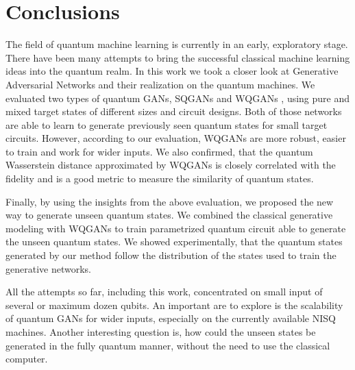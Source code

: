 \chapter{Conclusions}\label{chapter:conclusions}
The field of quantum machine learning is currently in an early, exploratory
stage. There have been many attempts to bring the successful classical machine
learning ideas into the quantum realm. In this work we took a closer look at
Generative Adversarial Networks and their realization on the quantum machines.
We evaluated two types of quantum GANs, SQGANs \cite{Dallaire_Demers_2018} and
WQGANs \cite{depalma2020quantum}, using pure and mixed target states of
different sizes and circuit designs. Both of those networks are able to learn to
generate previously seen quantum states for small target circuits.
However, according to our evaluation, WQGANs are more robust, easier to train
and work for wider inputs. We also confirmed, that the quantum
Wasserstein distance approximated by WQGANs is closely correlated with the fidelity
and is a good metric to measure the similarity of quantum states.

Finally, by using the insights from the above evaluation, we proposed the new way
to generate unseen quantum states. We combined the classical generative modeling 
with WQGANs to train parametrized quantum circuit able to generate the unseen quantum
states. We showed experimentally, that the quantum states generated by our
method follow the distribution of the states used to train the generative networks.

All the attempts so far, including this work, concentrated on small input of
several or maximum dozen qubits. An important are to explore is the
scalability of quantum GANs for wider inputs, especially on the currently available NISQ machines.  
Another interesting question is, how could the unseen states be generated
in the fully quantum manner, without the need to use the classical computer. 

